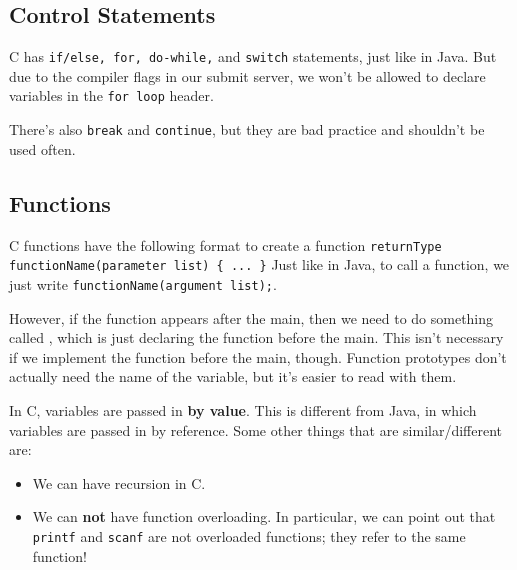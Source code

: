 



\subsection{Control Statements}
C has \verb!if/else, for, do-while,! and \verb!switch! statements, just like in Java. But due to the compiler flags in our submit server, we won't be allowed to declare variables in the \verb!for loop! header. 

There's also \verb!break! and \verb!continue!, but they are bad practice and shouldn't be used often.


\subsection{Functions}
C functions have the following format to create a function \verb!returnType functionName(parameter list) { ... }! Just like in Java, to call a function, we just write \verb!functionName(argument list);!. 

However, if the function appears after the main, then we need to do something called , which is just declaring the function before the main. This isn't necessary if we implement the function before the main, though. Function prototypes don't actually need the name of the variable, but it's easier to read with them.


In C, variables are passed in \textbf{by value}. This is different from Java, in which variables are passed in by reference. Some other things that are similar/different are: \begin{itemize}
    \item We can have recursion in C.
    \item We can \textbf{not} have function overloading. In particular, we can point out that \verb!printf! and \verb!scanf! are not overloaded functions; they refer to the same function!
\end{itemize}

